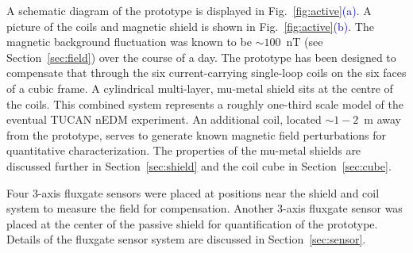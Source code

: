 




A schematic diagram of the prototype is displayed in Fig.~\ref{fig:active}\textcolor{blue}{(a)}. A picture of the coils and magnetic shield is shown in Fig.~\ref{fig:active}\textcolor{blue}{(b)}. The magnetic background fluctuation was known to be $\sim100$~nT (see Section~\ref{sec:field}) over the course of a day. The prototype has been designed to compensate that through the six current-carrying single-loop coils on the six faces of a cubic frame. A cylindrical multi-layer, mu-metal shield sits at the centre of the coils. This combined system represents a roughly one-third scale model of the eventual TUCAN nEDM experiment. An additional coil, located $\sim1-2$~m away from the prototype, serves to generate known magnetic field perturbations for quantitative characterization. The properties of the mu-metal shields are discussed further in Section~\ref{sec:shield} and the coil cube in Section~\ref{sec:cube}. 

Four 3-axis fluxgate sensors were placed at positions near the shield and coil system to measure the field for compensation. Another 3-axis fluxgate sensor was placed at the center of the passive shield for quantification of the prototype. Details of the fluxgate sensor system are discussed in Section~\ref{sec:sensor}.


